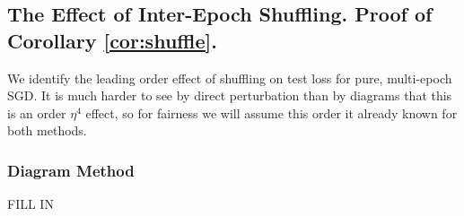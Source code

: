 \documentclass{article}
\theoremstyle{plain}
\theoremstyle{definition}
\begin{document}

    \subsection{
        The Effect of Inter-Epoch Shuffling.
        Proof of Corollary \ref{cor:shuffle}.
    }
        We identify the leading order effect of shuffling on test loss for
        pure, multi-epoch SGD.  It is much harder to see by direct perturbation
        than by diagrams that this is an order $\eta^4$ effect, so for fairness
        we will assume this order it already known for both methods.

        \subsubsection*{Diagram Method}

            {\color{moor} FILL IN}
            
\end{document}
